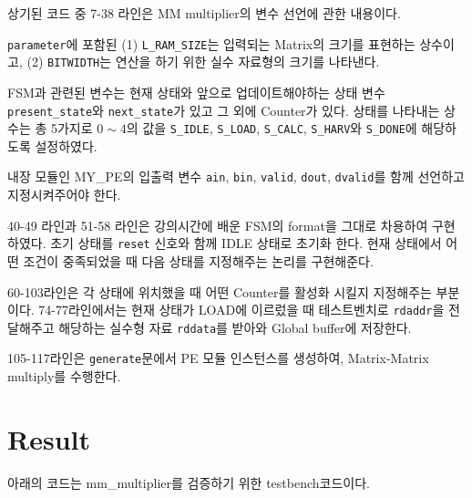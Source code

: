 \documentclass{article}
\begin{document}
\begin{itemize*}
\item 상기된 코드 중 7-38 라인은 MM multiplier의 변수 선언에 관한 내용이다.
\begin{itemize*}
\item \texttt{parameter}에 포함된 (1) \texttt{L\_RAM\_SIZE}는 입력되는 Matrix의 크기를 표현하는 상수이고, (2) \texttt{BITWIDTH}는 연산을 하기 위한 실수 자료형의 크기를 나타낸다.
\item FSM과 관련된 변수는 현재 상태와 앞으로 업데이트해야하는 상태 변수 \texttt{present\_state}와 \texttt{next\_state}가 있고 그 외에 Counter가 있다. 상태를 나타내는 상수는 총 5가지로 $0 \sim 4$의 값을 \texttt{S\_IDLE}, \texttt{S\_LOAD}, \texttt{S\_CALC}, \texttt{S\_HARV}와 \texttt{S\_DONE}에 해당하도록 설정하였다.
\item 내장 모듈인 MY\_PE의 입출력 변수 \texttt{ain}, \texttt{bin}, \texttt{valid}, \texttt{dout}, \texttt{dvalid}를 함께 선언하고 지정시켜주어야 한다.
\end{itemize*}

\item 40-49 라인과 51-58 라인은 강의시간에 배운 FSM의 format을
그대로 차용하여 구현하였다. 초기 상태를 \texttt{reset} 신호와 함께 IDLE 상태로 초기화 한다. 현재 상태에서 어떤 조건이 중족되었을 때 다음 상태를 지정해주는 논리를 구현해준다.

\item 60-103라인은 각 상태에 위치했을 때 어떤 Counter를 활성화 시킬지 지정해주는 부분이다. 74-77라인에서는 현재 상태가 LOAD에 이르렀을 때 테스트벤치로 \texttt{rdaddr}을 전달해주고 해당하는 실수형 자료 \texttt{rddata}를 받아와 Global buffer에 저장한다.

\item 105-117라인은 \texttt{generate}문에서 PE 모듈 인스턴스를 생성하여, Matrix-Matrix multiply를 수행한다.
\end{itemize*}

\newpage
\section{Result}
아래의 코드는 mm\_multiplier를 검증하기 위한 testbench코드이다.
\end{document}

